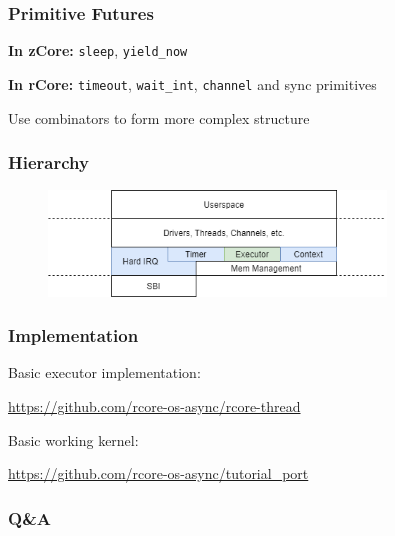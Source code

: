 \documentclass[UTF-8]{ctexbeamer}
\begin{document}
\begin{frame}
  \frametitle{Primitive Futures}

  \textbf{In zCore:} \texttt{sleep}, \texttt{yield\_now}

  \textbf{In rCore:} \texttt{timeout}, \texttt{wait\_int}, \texttt{channel} and sync primitives

  \pause
  \vspace{1em}

  Use combinators to form more complex structure
\end{frame}

\begin{frame}
  \frametitle{Hierarchy}

  \begin{figure}
    \centering

    \includegraphics[width=0.8\textwidth]{assets/hierarchy.png}
  \end{figure}
\end{frame}

\begin{frame}
  \frametitle{Implementation}

  Basic executor implementation:

  \url{https://github.com/rcore-os-async/rcore-thread}

  \vspace{1em}

  Basic working kernel:

  \url{https://github.com/rcore-os-async/tutorial_port}

\end{frame}

\begin{frame}
  \frametitle{Q\&A}
\end{frame}
\end{document}
